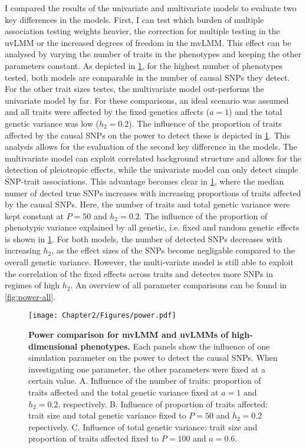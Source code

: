 I compared the results of the univariate and multivariate models to evaluate  two key differences in the models. First, I can test which burden of multiple association testing weights heavier, the correction for multiple testing in the uvLMM or the increased degrees of freedom in the mvLMM. This effect can be analysed by varying the number of traits in the phenotypes and keeping the other parameters constant. As depicted in \cref{fig:power}, for the highest number of phenotypes tested, both models are comparable in the number of causal SNPs they detect. For the other trait sizes testes, the multivariate model out-performs the univariate model by far. For these comparisons, an ideal scenario was assumed and all traits were affected by the fixed genetics affects (\(a=1\)) and the total genetic variance was low (\(h_2=0.2\)). The influence of the proportion of traits affected by the causal SNPs on the power to detect these is depicted in \cref{fig:power}. This analysis allows for the evaluation of the second key difference in the models. The multivariate model can exploit correlated background structure and allows for the detection of pleiotropic effects, while the univariate model can only detect simple SNP-trait associations. This advantage becomes clear in \cref{fig:power}, where the median numer of dected true SNPs increases with increasing proportions of traits affected by the causal SNPs.  Here, the number of traits and total genetic variance were kept constant at \(P=50\) and \(h_2=0.2\). The influence of the proportion of phenotypic variance explained by all genetic, i.e. fixed and random genetic effects is shown in \cref{fig:power}. For both models, the number of detected SNPs decreases with increasing \(h_2\), as the effect sizes of the SNPs become negligable compared to the overall genetic variance. However, the multi-variate model is still able to exploit the correlation of the fixed effects across traits and detectes more SNPs in regimes of high  \(h_2\). An overview of all parameter comparisons can be found in \cref{fig:power-all}. 
 
\begin{figure}[hbtp]
	\centering
	\texttt{[image: Chapter2/Figures/power.pdf]}
	\caption[\textbf{Power comparison for mvLMM and uvLMMs of high-dimensional phenotypes.}]{\textbf{Power comparison for mvLMM and uvLMMs of high-dimensional phenotypes.} Each panels show the influence of one simulation parameter on the power to detect the causal SNPs. When investigating one parameter, the other parameters were fixed at a certain value. A. Influence of the number of traits: proportion of traits affected and the total genetic variance fixed at \(a=1\) and \(h_2=0.2\), respectively. B. Influence of proportion of traits affected: trait size and total genetic variance fixed to \(P=50\) and \(h_2=0.2\) repectively. C. Influence of total genetic variance:  trait size and  proportion of traits affected fixed to \(P=100\) and \(a=0.6\).} 
 	\label{fig:power}
\end{figure}

